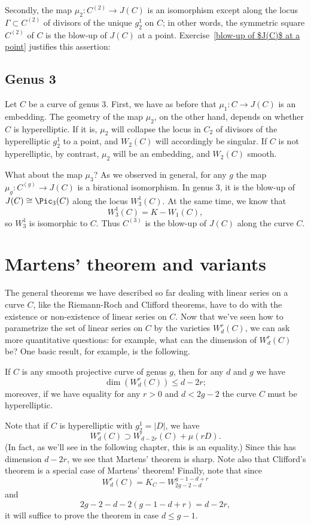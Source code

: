 Secondly, the map $\mu_2 : C^{(2)} \to J(C)$ is an isomorphism except along the locus $\Gamma \subset  C^{(2)} $ of divisors of the unique $g^1_2$ on $C$; in other words, the symmetric square $ C^{(2)} $ of $C$ is the blow-up of $J(C)$ at a point. Exercise~\ref{blow-up of $J(C)$ at a point} justifies this assertion:


\subsection{Genus 3}

Let $C$ be a curve of genus 3. First, we have as before that $\mu_1 : C \to J(C)$ is an embedding. The geometry of the map $\mu_2$, on the other hand, depends on whether  $C$ is hyperelliptic. If it is, $\mu_2$ will collapse the locus in $C_2$ of divisors of the hyperelliptic $g^1_2$ to a point, and $W_2(C)$ will accordingly be singular. If $C$ is not hyperelliptic, by contrast, $\mu_2$ will be an embedding, and $W_2(C)$ smooth.

What about the map $\mu_3$? As we observed in general, for any $g$ the map $\mu_g : C^{(g)} \to J(C)$ is a birational isomorphism. In genus 3, it is the blow-up of $J(C) \cong \Pic_3(C)$ along the locus $W^1_3(C)$. At the same time, we know that
$$
W^1_3(C) = K - W_1(C),
$$
so $W^1_3$ is isomorphic to $C$. Thus $C^{(3)}$ is the blow-up of $J(C)$ along the curve $C$.

\section{Martens' theorem and variants}

The general theorems we have described so far dealing with linear series on a curve $C$, like the Riemann-Roch and Clifford theorems, have to do with the existence or non-existence of linear series on $C$. Now that we've seen how to parametrize the set of linear series on $C$ by the varieties $W^r_d(C)$, we can ask more quantitative questions: for example, what can the dimension of $W^r_d(C)$ be? One basic result, for example, is the following.

\begin{theorem}\cite{Martens}
If $C$ is any smooth projective curve of genus $g$, then for any $d$ and $g$ we have
$$
\dim(W^r_d(C)) \leq d-2r;
$$
moreover, if we have equality for any $r > 0$ and $d < 2g-2$ the curve $C$ must be hyperelliptic.
\end{theorem}

Note that if $C$ is hyperelliptic with $g^1_2 = |D|$, we have
$$
W^r_d(C) \supset W_{d-2r}(C) + \mu(rD).
$$
(In fact, as we'll see in the following chapter, this is an equality.) Since this has dimension $d-2r$, we see that Martens' theorem is sharp. Note also that Clifford's theorem is a special case of Martens' theorem! Finally, note that since
$$
W^r_d(C) = K_C - W^{g-1-d+r}_{2g-2-d}
$$
and
$$
2g-2-d - 2(g-1-d+r) = d-2r,
$$
it will suffice to prove the theorem in case $d \leq g-1$.

